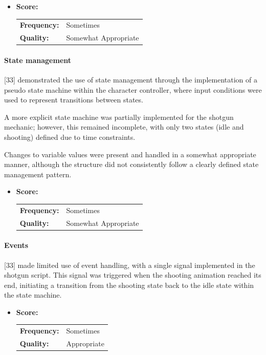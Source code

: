 \begin{itemize}
	\item \textbf{Score:}
	      \begin{tabular}{ll}
		      \textbf{Frequency:} & Sometimes            \\
		      \textbf{Quality:}   & Somewhat Appropriate \\
	      \end{tabular}
\end{itemize}

\paragraph{State management}


[33] demonstrated the use of state management through the implementation of a pseudo state machine within the character controller, where input conditions were used to represent transitions between states.

A more explicit state machine was partially implemented for the shotgun mechanic; however, this remained incomplete, with only two states (idle and shooting) defined due to time constraints.

Changes to variable values were present and handled in a somewhat appropriate manner, although the structure did not consistently follow a clearly defined state management pattern.


\begin{itemize}
	\item \textbf{Score:}
	      \begin{tabular}{ll}
		      \textbf{Frequency:} & Sometimes            \\
		      \textbf{Quality:}   & Somewhat Appropriate \\
	      \end{tabular}
\end{itemize}

\paragraph{Events}


[33] made limited use of event handling, with a single signal implemented in the shotgun script.
This signal was triggered when the shooting animation reached its end, initiating a transition from the shooting state back to the idle state within the state machine.



\begin{itemize}
	\item \textbf{Score:}
	      \begin{tabular}{ll}
		      \textbf{Frequency:} & Sometimes   \\
		      \textbf{Quality:}   & Appropriate \\
	      \end{tabular}
\end{itemize}


